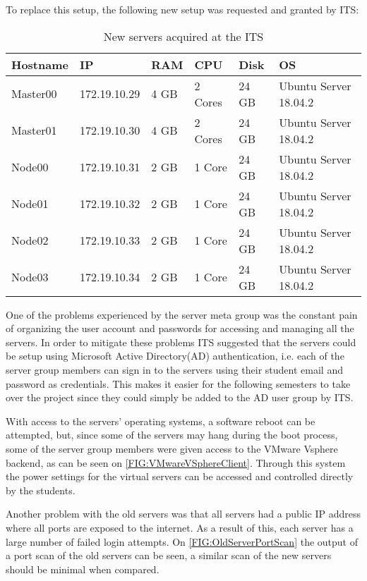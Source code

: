 To replace this setup, the following new setup was requested and granted by ITS:

\begin{table}[H]
\begin{tabular}{|l|l|l|l|l|l|}
\hline
Hostname 	& IP			& RAM 	& CPU 		& Disk 		& OS 						\\ \hline
Master00 	& 172.19.10.29	& 4 GB	& 2 Cores	& 24 GB		& Ubuntu Server 18.04.2		\\ \hline
Master01 	& 172.19.10.30	& 4 GB	& 2 Cores	& 24 GB		& Ubuntu Server 18.04.2		\\ \hline
Node00 		& 172.19.10.31	& 2 GB	& 1 Core	& 24 GB		& Ubuntu Server 18.04.2		\\ \hline
Node01 		& 172.19.10.32	& 2 GB	& 1 Core	& 24 GB		& Ubuntu Server 18.04.2		\\ \hline
Node02 		& 172.19.10.33	& 2 GB	& 1 Core	& 24 GB		& Ubuntu Server 18.04.2		\\ \hline
Node03 		& 172.19.10.34	& 2 GB	& 1 Core	& 24 GB		& Ubuntu Server 18.04.2		\\ \hline
\end{tabular}
\caption{New servers acquired at the ITS}
\end{table}

One of the problems experienced by the server meta group was the constant pain of organizing the user account and passwords for accessing and managing all the servers.
In order to mitigate these problems ITS suggested that the servers could be setup using Microsoft Active Directory(AD) authentication, i.e. each of the server group members can sign in to the servers using their student email and password as credentials.
This makes it easier for the following semesters to take over the project since they could simply be added to the AD user group by ITS.

With access to the servers' operating systems, a software reboot can be attempted, but, since some of the servers may hang during the boot process, some of the server group members were given access to the VMware Vsphere backend, as can be seen on \autoref{FIG:VMwareVSphereClient}.
Through this system the power settings for the virtual servers can be accessed and controlled directly by the students.

Another problem with the old servers was that all servers had a public IP address where all ports are exposed to the internet.
As a result of this, each server has a large number of failed login attempts.
On \autoref{FIG:OldServerPortScan} the output of a port scan of the old servers can be seen, a similar scan of the new servers should be minimal when compared.

